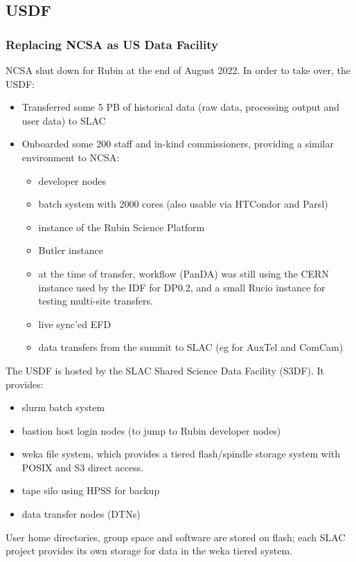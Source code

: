  
\subsection{USDF}

\subsubsection{Replacing NCSA as US Data Facility}

NCSA shut down for Rubin at the end of August 2022. In order to take
over, the USDF:
\begin{itemize}
\item Transferred some 5 PB of historical data (raw data, processing
output and user data) to SLAC
\item Onboarded some 200 staff and in-kind commissioners, providing a
similar environment to NCSA:
\begin{itemize}
\item developer nodes
\item batch system with 2000 cores (also usable via HTCondor and Parsl)
\item instance of the Rubin Science Platform
\item Butler instance
\item at the time of transfer, workflow (PanDA) was still using the
CERN instance used by the IDF for DP0.2, and a small Rucio instance
for testing multi-site transfers.
\item live sync'ed EFD
\item data transfers from the summit to SLAC (eg for AuxTel and ComCam)
\end{itemize}
\end{itemize}

The USDF is hosted by the SLAC Shared Science Data Facility (S3DF). It
provides:
\begin{itemize}
\item slurm batch system
\item bastion host login nodes (to jump to Rubin developer nodes)
\item weka file system, which provides a tiered flash/spindle storage
system with POSIX and S3 direct access.
\item tape silo using HPSS for backup
\item data transfer nodes (DTNs)
\end{itemize}

User home directories, group space and software are stored on flash;
each SLAC project provides its own storage for data in the weka tiered system.

